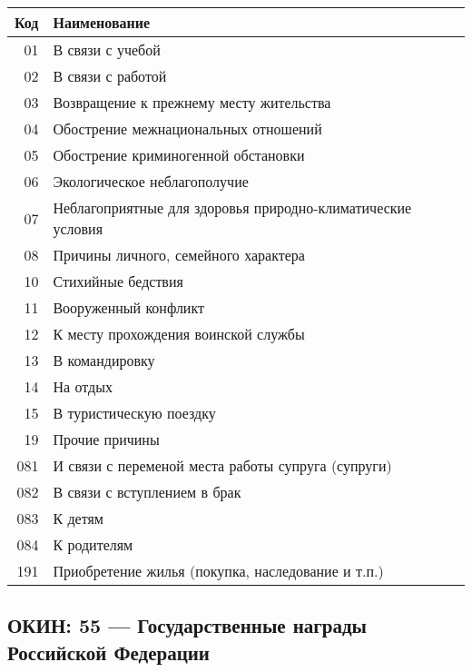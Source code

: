 \documentclass[10pt, a4paper, titlepage]{article}
\begin{document}
\begin{center}
    \begin{tabular}{rp{}}
        \hline
        \textbf{Код} & \textbf{Наименование} \\ \hline
        01 & В связи с учебой \\
        02 & В связи с работой \\
        03 & Возвращение к прежнему месту жительства \\
        04 & Обострение межнациональных отношений \\
        05 & Обострение криминогенной обстановки \\
        06 & Экологическое неблагополучие \\
        07 & Неблагоприятные для здоровья природно-климатические условия \\
        08 & Причины личного, семейного характера \\
        10 & Стихийные бедствия \\
        11 & Вооруженный конфликт \\
        12 & К месту прохождения воинской службы \\
        13 & В командировку \\
        14 & На отдых \\
        15 & В туристическую поездку \\
        19 & Прочие причины \\
        081 & И связи с переменой места работы супруга (супруги) \\
        082 & В связи с вступлением в брак \\
        083 & К детям \\
        084 & К родителям \\
        191 & Приобретение жилья (покупка, наследование и т.п.) \\
    \end{tabular}
\end{center}

\subsection{ОКИН: 55 --- Государственные награды Российской Федерации}
\end{document}
